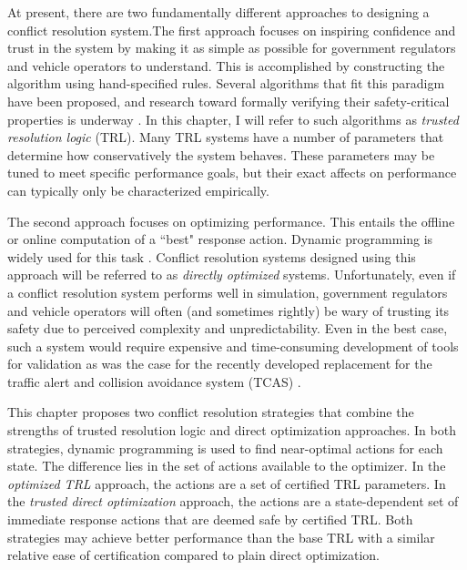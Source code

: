 At present, there are two fundamentally different approaches to designing a conflict resolution system.The first approach focuses on inspiring confidence and trust in the system by making it as simple as possible for government regulators and vehicle operators to understand.
This is accomplished by constructing the algorithm using hand-specified rules.
Several algorithms that fit this paradigm have been proposed, and research toward formally verifying their safety-critical properties is underway \cite{RB-CF-HE:09,GH-RB-JM:11,HH-JJ-CM:10,AN-CM-GD:12}.  In this chapter, I will  refer to such algorithms as \emph{trusted resolution logic} (TRL).
Many TRL systems have a number of parameters that determine how conservatively the system behaves.
These parameters may be tuned to meet specific performance goals, but their exact affects on performance can typically only be characterized empirically.

The second approach focuses on optimizing performance.
This entails the offline or online  computation of a ``best" response action. Dynamic programming is widely used for this task \cite{ST-MJK-LPK-TLP-JKK:10,MJK-JPC:11,MJK-JPC-LPK-TL:10,LPK-TL:09,HB-DH-MJK-WSL:12,JEH-MJK-WAO:13}. 
Conflict resolution systems designed using this approach will be referred to as \emph{directly optimized} systems. 
Unfortunately, even if a conflict resolution system performs well in simulation, government regulators and vehicle operators will often (and sometimes rightly) be wary of trusting its safety due to perceived complexity and unpredictability.
Even in the best case, such a system would require expensive and time-consuming development of tools for validation as was the case for the recently developed replacement for the traffic alert and collision avoidance system (TCAS) \cite{JEH-MJK-WAO:13}. 

This chapter proposes two conflict resolution strategies that combine the strengths of trusted resolution logic and direct optimization approaches.
In both strategies, dynamic programming is used to find near-optimal actions for each state.
The difference lies in the set of actions available to the optimizer.
In the \emph{optimized TRL} approach, the actions are a set of certified TRL parameters.
In the \emph{trusted direct optimization} approach, the actions are a state-dependent set of immediate response actions that are deemed safe by certified TRL.
Both strategies may achieve better performance than the base TRL with a similar relative ease of certification compared to plain direct optimization.

